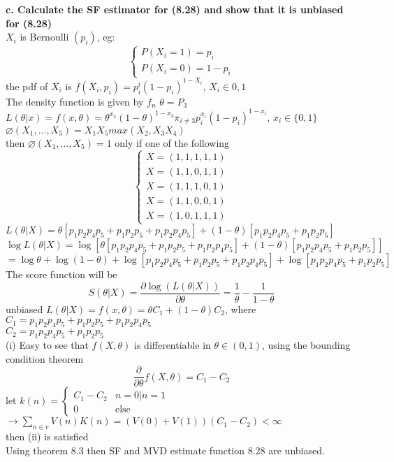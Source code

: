 \documentclass{article}
\begin{document}
\textbf{c. Calculate the SF estimator for (8.28) and show that it is unbiased for (8.28)} \\
$X_i$ is Bernoulli $(p_i)$, eg:
$$ \left\{ \begin{array}{rcl} P(X_i=1)=p_i  \\ P(X_i=0)=1-p_i \end{array}\right. $$
the pdf of $X_i$ is $ f(X_i, p_i) = p_i^i(1-p_i)^{1-X_i} $, $X_i\in{0,1}$  \\
The density function is given by $f_n$ $\theta=P_3$ \\
$ L(\theta|x) = f(x,\theta) = \theta^{x_3}(1-\theta)^{1-x_3}\pi_{i\neq 3}p_i^{x_i}(1-p_i)^{1-x_i} $, $x_i\in\{0,1\}$ \\
$ \varnothing(X_1,...,X_5) = X_1X_5max(X_2,X_3X_4) $ \\
then $ \varnothing(X_1,...,X_5) = 1 $ only if one of the following\\
$$ \left\{ \begin{array}{rcl} X = (1,1,1,1,1)  \\ X = (1,1,0,1,1) \\ X = (1,1,1,0,1) \\ X = (1,1,0,0,1) \\ X = (1,0,1,1,1) \end{array}\right. $$
$L(\theta|X)=\theta[p_1p_2p_4p_5+p_1p_2p_5+p_1p_2p_4p_5]+(1-\theta)[p_1p_2p_4p_5+p_1p_2p_5]$  \\
$\log L(\theta|X) = \log [\theta[p_1p_2p_4p_5+p_1p_2p_5+p_1p_2p_4p_5]+(1-\theta)[p_1p_2p_4p_5+p_1p_2p_5]] $  \\
$ = \log \theta + \log(1-\theta) + \log[p_1p_2p_4p_5+p_1p_2p_5+p_1p_2p_4p_5] + \log[p_1p_2p_4p_5+p_1p_2p_5] $  \\
The score function will be
$$ S(\theta|X) =  \frac{\partial \log(L(\theta|X))}{\partial \theta} = \frac{1}{\theta}-\frac{1}{1-\theta} $$
unbiased $L(\theta|X)=f(x,\theta)=\theta C_1+(1-\theta)C_2$, where  \\
$C_1 = p_1p_2p_4p_5+p_1p_2p_5+p_1p_2p_4p_5 $  \\
$C_2 = p_1p_2p_4p_5+p_1p_2p_5 $  \\
(i) Easy to see that $f(X,\theta)$ is differentiable  in $\theta \in(0,1)$, using the bounding condition theorem \\
$$ \frac{\partial}{\partial \theta}f(X,\theta) = C_1-C_2 $$
let $k(n) = \left \{ \begin{array}{rcl}C_1-C_2 & n=0|n=1 \\ 0 & \mbox{else} \end{array}\right.$  \\
$\rightarrow \sum_{n\in v}V(n)K(n)=(V(0)+V(1))(C_1-C_2) < \infty$  \\
then (ii) is satisfied  \\
Using theorem 8.3 then SF and MVD estimate function 8.28 are unbiased.
 
\end{document}
